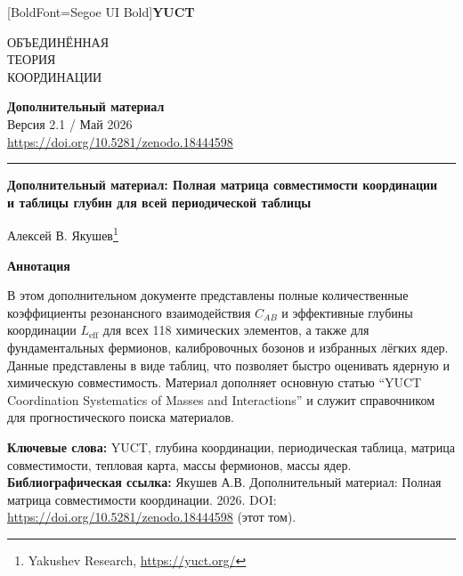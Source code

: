 \documentclass[11pt,a4paper]{article}
\newcommand{\makeheader}{%
	\noindent
	\begin{minipage}{0.17\textwidth}
		\raggedright
		{\fontspec{Segoe UI}[BoldFont=Segoe UI Bold]\bfseries\color{skyblue}\fontsize{46}{46}\selectfont YUCT}%
	\end{minipage}%
	\hspace{30pt}
	\begin{minipage}{0.32\textwidth}
		\raggedright
		{\sffamily\fontsize{11}{13}\selectfont ОБЪЕДИНЁННАЯ\\ ТЕОРИЯ\\ КООРДИНАЦИИ}%
	\end{minipage}%
	\hfill
	\begin{minipage}{0.38\textwidth}
		\raggedleft
		{\sffamily\bfseries Дополнительный материал}\\ 
		{\sffamily Версия 2.1 / Май 2026}\\ 
		{\sffamily\footnotesize \url{https://doi.org/10.5281/zenodo.18444598}}%
	\end{minipage}
	\par\vspace{5pt}
	\noindent\textcolor{gold}{\rule{\textwidth}{1.6pt}}
	\par\vspace{0pt}
}
\begin{document}
	\thispagestyle{firstpage}
	\makeheader
	
	\vspace{0cm}
	{\LARGE\bfseries Дополнительный материал: Полная матрица совместимости координации \\ 
		\Large и таблицы глубин для всей периодической таблицы \par}
	\vspace{0.2cm}
	
	{\large Алексей В. Якушев\footnote{Yakushev Research, \url{https://yuct.org/}}} \\
	\vspace{0.0cm}
	
	{\color{darkblue}\textbf{\LARGE Аннотация}} \par
	{\large
		\noindent
		В этом дополнительном документе представлены полные количественные коэффициенты резонансного взаимодействия \(C_{AB}\) и эффективные глубины координации \(L_{\mathrm{eff}}\) для всех 118 химических элементов, а также для фундаментальных фермионов, калибровочных бозонов и избранных лёгких ядер. Данные представлены в виде таблиц, что позволяет быстро оценивать ядерную и химическую совместимость. Материал дополняет основную статью ``YUCT Coordination Systematics of Masses and Interactions'' и служит справочником для прогностического поиска материалов.
	}
	
	\vspace{0.1cm}
	\noindent
	{\color{darkblue}\textbf{Ключевые слова:}} YUCT, глубина координации, периодическая таблица, матрица совместимости, тепловая карта, массы фермионов, массы ядер.
	\vspace{0.1cm}
	\noindent
	{\color{darkblue}\textbf{Библиографическая ссылка:}} Якушев А.В. Дополнительный материал: Полная матрица совместимости координации. 2026. DOI: \url{https://doi.org/10.5281/zenodo.18444598} (этот том).
	
	\vspace{0.4cm}
	
\end{document}
